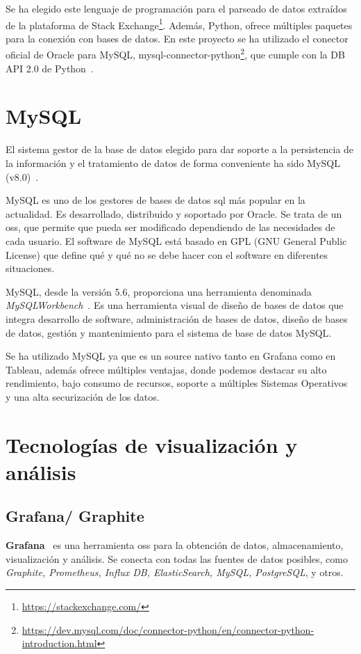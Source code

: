 \documentclass[a4paper, 12pt]{book}
\begin{document}
Se ha elegido este lenguaje de programación para el parseado de datos extraídos de la plataforma de Stack Exchange\footnote{\url{https://stackexchange.com/}}. Además, Python, ofrece múltiples paquetes para la conexión con bases de datos. En este proyecto se ha utilizado el conector oficial de Oracle para MySQL, mysql-connector-python\footnote{\url{https://dev.mysql.com/doc/connector-python/en/connector-python-introduction.html}}, que cumple con la DB API 2.0 de Python~\cite{Python}.

\section{MySQL} 
\label{sec:Mysql}

El sistema gestor de la base de datos elegido para dar soporte a la persistencia de la información y el tratamiento de datos de forma conveniente ha sido MySQL (v8.0)~\cite{MYSQL}.

MySQL es uno de los gestores de bases de datos \gls{sql} más popular en la actualidad. Es desarrollado, distribuido y soportado por Oracle. Se trata de un \gls{oss}, que permite que pueda ser modificado dependiendo de las necesidades de cada usuario. El software de MySQL está basado en GPL (GNU General Public License) que define qué y qué no se debe hacer con el software en diferentes situaciones.

MySQL, desde la versión 5.6, proporciona una herramienta denominada  \textit{MySQLWorkbench}~\cite{krogh2020mysql}. Es una herramienta visual de diseño de bases de datos que integra desarrollo de software, administración de bases de datos, diseño de bases de datos, gestión y mantenimiento para el sistema de base de datos MySQL.

Se ha utilizado MySQL ya que es un source nativo tanto en Grafana como en Tableau, además ofrece múltiples ventajas, donde podemos destacar su alto rendimiento, bajo consumo de recursos, soporte a múltiples Sistemas Operativos y una alta securización de los datos.

\section{Tecnologías de visualización y análisis} 
\label{sec:Tenologias_va}
\subsection{Grafana/ Graphite} 
\label{sec:Grafana} 

\textbf{Grafana}~\cite{chakraborty2021grafana} es una herramienta \gls{oss} para la obtención de datos, almacenamiento, visualización y análisis.
Se conecta con todas las fuentes de datos posibles, como \textit{Graphite, Prometheus, Influx DB, ElasticSearch, MySQL, PostgreSQL}, y otros.
\end{document}
